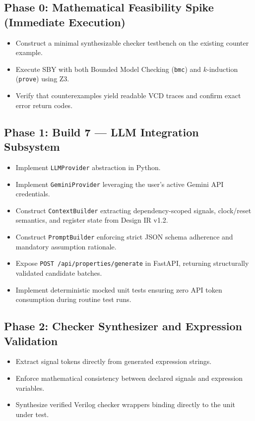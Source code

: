 \documentclass[11pt,a4paper]{article}
\begin{document}
\subsection{Phase 0: Mathematical Feasibility Spike (Immediate Execution)}
\begin{itemize}[noitemsep]
    \item Construct a minimal synthesizable checker testbench on the existing counter example.
    \item Execute SBY with both Bounded Model Checking (\texttt{bmc}) and $k$-induction (\texttt{prove}) using Z3.
    \item Verify that counterexamples yield readable VCD traces and confirm exact error return codes.
\end{itemize}

\subsection{Phase 1: Build 7 --- LLM Integration Subsystem}
\begin{itemize}[noitemsep]
    \item Implement \texttt{LLMProvider} abstraction in Python.
    \item Implement \texttt{GeminiProvider} leveraging the user's active Gemini API credentials.
    \item Construct \texttt{ContextBuilder} extracting dependency-scoped signals, clock/reset semantics, and register state from Design IR v1.2.
    \item Construct \texttt{PromptBuilder} enforcing strict JSON schema adherence and mandatory assumption rationale.
    \item Expose \texttt{POST /api/properties/generate} in FastAPI, returning structurally validated candidate batches.
    \item Implement deterministic mocked unit tests ensuring zero API token consumption during routine test runs.
\end{itemize}

\subsection{Phase 2: Checker Synthesizer and Expression Validation}
\begin{itemize}[noitemsep]
    \item Extract signal tokens directly from generated expression strings.
    \item Enforce mathematical consistency between declared signals and expression variables.
    \item Synthesize verified Verilog checker wrappers binding directly to the unit under test.
\end{itemize}
\end{document}
